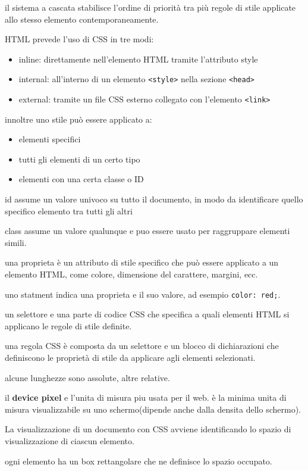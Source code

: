 \documentclass[12pt]{article}
\begin{document}
il sistema a cascata stabilisce l'ordine di priorità tra più regole di stile applicate allo stesso elemento contemporaneamente.

HTML prevede l'uso di CSS in tre modi:
\begin{itemize}
    \item inline: direttamente nell'elemento HTML tramite l'attributo style
    \item internal: all'interno di un elemento \texttt{<style>} nella sezione \texttt{<head>}
    \item external: tramite un file CSS esterno collegato con l'elemento \texttt{<link>}
\end{itemize}   

innoltre uno stile può essere applicato a:
\begin{itemize}
    \item elementi specifici
    \item tutti gli elementi di un certo tipo
    \item elementi con una certa classe o ID
    \end{itemize}

    id assume un valore univoco su tutto il
documento, in modo da identificare quello
specifico elemento tra tutti gli altri

class assume un valore qualunque e puo essere usato per raggruppare elementi simili.

una proprieta  è un attributo di stile specifico che può essere applicato a un elemento HTML, come colore, dimensione del carattere, margini, ecc.

uno statment indica una proprieta e il suo valore, ad esempio \texttt{color: red;}.

un selettore e una parte di codice CSS che specifica a quali elementi HTML si applicano le regole di stile definite.

una regola CSS è composta da un selettore e un blocco di dichiarazioni che definiscono le proprietà di stile da applicare agli elementi selezionati.

alcune lunghezze sono assolute, altre relative.

il \textbf{device pixel} e l'unita di misura piu usata per il web. è la minima unita di misura visualizzabile su uno schermo(dipende anche dalla densita dello schermo).

La visualizzazione di un documento con CSS
avviene identificando lo spazio di
visualizzazione di ciascun elemento.

ogni elemento ha un box rettangolare che ne definisce lo spazio occupato.
\end{document}
